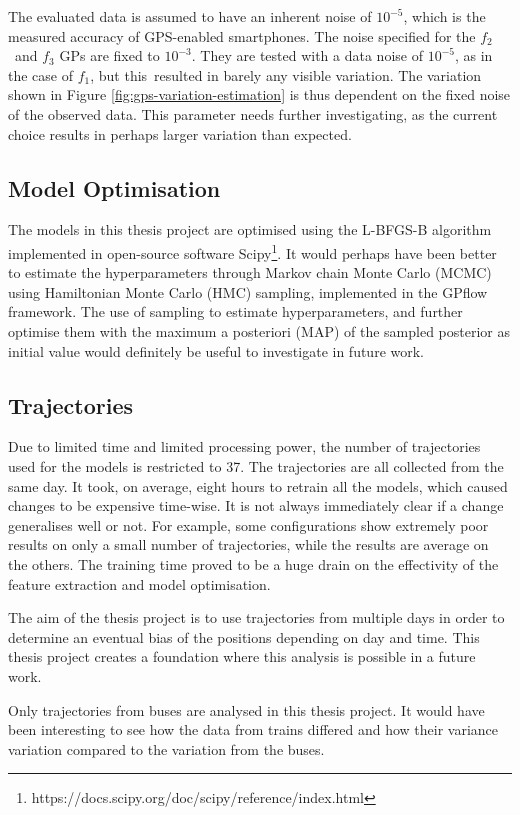 The evaluated data is assumed to have an inherent noise of $10^{-5}$, which is the measured accuracy of GPS-enabled smartphones.
The noise specified for the $f_2$ and $f_3$ GPs are fixed to $10^{-3}$.
They are tested with a data noise of $10^{-5}$, as in the case of $f_1$, but this resulted in barely any visible variation.
The variation shown in Figure \ref{fig:gps-variation-estimation} is thus dependent on the fixed noise of the observed data.
This parameter needs further investigating, as the current choice results in perhaps larger variation than expected.

\subsection{Model Optimisation}
The models in this thesis project are optimised using the L-BFGS-B algorithm implemented in open-source software Scipy\footnote{https://docs.scipy.org/doc/scipy/reference/index.html}.
It would perhaps have been better to estimate the hyperparameters through Markov chain Monte Carlo (MCMC) using Hamiltonian Monte Carlo (HMC) sampling, implemented in the GPflow framework.
The use of sampling to estimate hyperparameters, and further optimise them with the maximum a posteriori (MAP) of the sampled posterior as initial value would definitely be useful to investigate in future work.

\subsection{Trajectories}
Due to limited time and limited processing power, the number of trajectories used for the models is restricted to 37.
The trajectories are all collected from the same day.
It took, on average, eight hours to retrain all the models, which caused changes to be expensive time-wise.
It is not always immediately clear if a change generalises well or not.
For example, some configurations show extremely poor results on only a small number of trajectories, while the results are average on the others.
The training time proved to be a huge drain on the effectivity of the feature extraction and model optimisation.

The aim of the thesis project is to use trajectories from multiple days in order to determine an eventual bias of the positions depending on day and time.
This thesis project creates a foundation where this analysis is possible in a future work.   

Only trajectories from buses are analysed in this thesis project.
It would have been interesting to see how the data from trains differed and how their variance variation compared to the variation from the buses.

